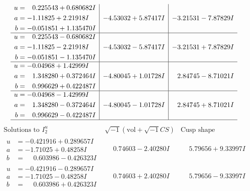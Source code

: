 \documentclass[1p]{elsarticle_modified}
\theoremstyle{definition}
\newcommand{\I}{\sqrt{-1}}
\begin{document}
$$\begin{array}{c|c|c}
\begin{aligned}
u &= \phantom{-}0.225543 + 0.680682 I \\
a &= -1.11825 + 2.21918 I \\
b &= -0.051851 + 1.135470 I\end{aligned}
 & -4.53032 + 5.87417 I & -3.21531 - 7.87829 I \\ \hline\begin{aligned}
u &= \phantom{-}0.225543 - 0.680682 I \\
a &= -1.11825 - 2.21918 I \\
b &= -0.051851 - 1.135470 I\end{aligned}
 & -4.53032 - 5.87417 I & -3.21531 + 7.87829 I \\ \hline\begin{aligned}
u &= -0.04968 + 1.42999 I \\
a &= \phantom{-}1.348280 + 0.372464 I \\
b &= \phantom{-}0.996629 + 0.422487 I\end{aligned}
 & -4.80045 + 1.01728 I & \phantom{-}2.84745 - 8.71021 I \\ \hline\begin{aligned}
u &= -0.04968 - 1.42999 I \\
a &= \phantom{-}1.348280 - 0.372464 I \\
b &= \phantom{-}0.996629 - 0.422487 I\end{aligned}
 & -4.80045 - 1.01728 I & \phantom{-}2.84745 + 8.71021 I\\
 \hline 
 \end{array}$$\newpage$$\begin{array}{c|c|c}  
\text{Solutions to }I^u_{2}& \I (\text{vol} + \sqrt{-1}CS) & \text{Cusp shape}\\
 \hline 
\begin{aligned}
u &= -0.421916 + 0.289657 I \\
a &= -1.71025 + 0.48258 I \\
b &= \phantom{-}0.603986 - 0.426323 I\end{aligned}
 & \phantom{-}0.74603 - 2.40280 I & \phantom{-}5.79656 + 9.33997 I \\ \hline\begin{aligned}
u &= -0.421916 - 0.289657 I \\
a &= -1.71025 - 0.48258 I \\
b &= \phantom{-}0.603986 + 0.426323 I\end{aligned}
 & \phantom{-}0.74603 + 2.40280 I & \phantom{-}5.79656 - 9.33997 I \\ \hline\begin{aligned}

\end{aligned}
\end{array}$$
\end{document}
